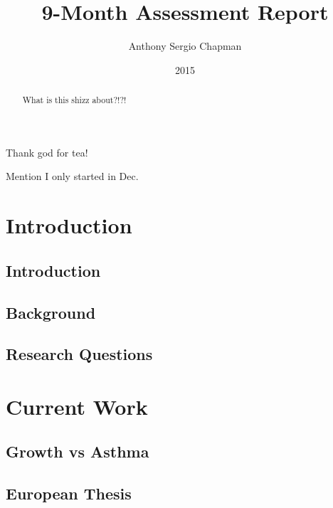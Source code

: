 \documentclass[bsc]{abdnthesis}
\author{Anthony Sergio Chapman}
\title{9-Month Assessment Report}
\date{2015}
\begin{document}
\maketitle
\makedeclaration


\begin{abstract}
  What is this shizz about?!?!
\end{abstract}

\begin{acknowledgements}
  Thank god for tea!
\end{acknowledgements}

\tableofcontents

Mention I only started in Dec. 

\chapter{Introduction}
\section{Introduction} %
\label{sec:introduction}

\section{Background} %
\label{sec:background}

\section{Research Questions} %
\label{sec:research_questions}



\chapter{Current Work}
\section{Growth vs Asthma} %
\label{sec:growth_vs_asthma}

\section{European Thesis} %
\label{sec:european_thesis}
\end{document}
